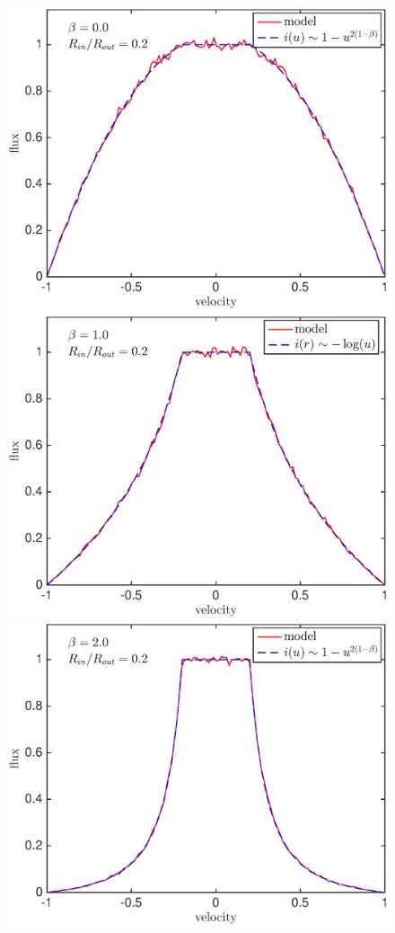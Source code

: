 \documentclass[useAMS,usenatbib,usegraphicx]{mnras}
\begin{document}
\begin{figure}
\includegraphics[trim =25 25 45 15,clip=true,scale=0.34]{params/A/b0_r0_2} 
\includegraphics[trim =37 25 45 15,clip=true,scale=0.34]{params/A/b1_r0_2}
\includegraphics[trim =37 25 45 15,clip=true,scale=0.34]{params/A/b2_r0_2}

\end{figure}
\end{document}
